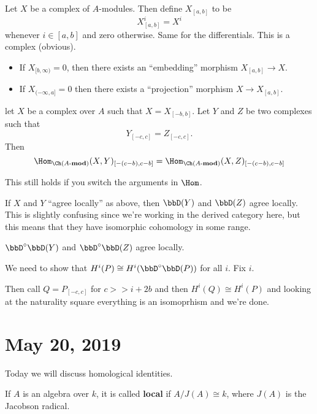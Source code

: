 \documentclass[12pt]{article}
\newcommand*{\Amod}{A\text{-}\mathbf{mod}}
\begin{document}
\begin{defn}
	Let $X$ be a complex of $A$-modules. Then define $X_{[a,b]}$ to be 
	\[X^i_{[a,b]}=X^i\]
	whenever $i\in[a,b]$ and zero otherwise. Same for the differentials. This is a complex (obvious).
\end{defn}

\begin{lem}
\begin{itemize}
	\item If $X_{[b,\infty)}=0$, then there exists an ``embedding'' morphism $X_{[a,b]}\to X$.
	\item If $X_{(-\infty,a]}=0$ then there exists a ``projection'' morphism $X\to X_{[a,b]}$.
\end{itemize}
\end{lem}
\begin{lem}
	let $X$ be  a complex over $A$ such that $X=X_{[-b,b]}$. Let $Y$ and $Z$ be two complexes such that 
	\[Y_{[-c,c]}=Z_{[-c,c]}.\]
	Then 
	\[\Hom_{\Ch(\Amod)}(X,Y)_{[-(c-b),c-b]}=\Hom_{\Ch(\Amod)}(X,Z)_{[-(c-b),c-b]}\]

	This still holds if you switch the arguments in $\Hom$.
\end{lem}
\begin{cor}
	If $X$ and $Y$ ``agree locally'' as above, then $\bbD(Y)$ and $\bbD(Z)$ agree locally. This is slightly confusing since 
	we're working in the derived category here, but this means that they have isomorphic cohomology in some range.
\end{cor}

\begin{cor}
	$\bbD^\circ\bbD(Y)$ and $\bbD^\circ\bbD(Z)$ agree locally.
\end{cor}

\begin{prf}
	We need to show that $H^i(P)\cong H^i(\bbD^\circ\bbD(P))$ for all $i$. Fix $i$.

	Then call $Q=P_{[-c,c]}$ for $c>> i+2b$ and then $H^i(Q)\cong H^i(P)$ and looking at the naturality square everything is an isomoprhism and we're done.
\end{prf}

\section{May 20, 2019}
Today we will discuss homological identities.

\begin{defn}
	If $A$ is an algebra over $k$, it is called \textbf{local} if $A/J(A)\cong k$, where $J(A)$ is the Jacobson radical.
\end{defn}
\end{document}
